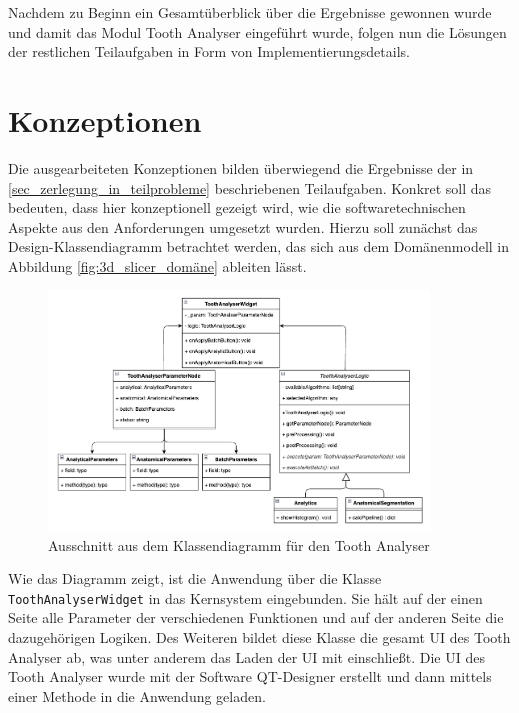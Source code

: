 Nachdem zu Beginn ein Gesamtüberblick über die Ergebnisse gewonnen wurde und damit
das Modul Tooth Analyser eingeführt wurde, folgen nun die Lösungen der
restlichen Teilaufgaben in Form von Implementierungsdetails.

\pagebreak

\section{Konzeptionen}
\label{sec:konzeptionen} Die ausgearbeiteten Konzeptionen bilden überwiegend die
Ergebnisse der in \ref{sec_zerlegung_in_teilprobleme} beschriebenen Teilaufgaben.
Konkret soll das bedeuten, dass hier konzeptionell gezeigt wird, wie die
softwaretechnischen Aspekte aus den Anforderungen umgesetzt wurden. Hierzu soll zunächst
das Design-Klassendiagramm betrachtet werden, das sich aus dem Domänenmodell in
Abbildung \ref{fig:3d_slicer_domäne} ableiten lässt.

\begin{figure}[h]
	\centering
	\includegraphics[width=0.9\textwidth]{
		img/tooth_analyser_class_diagram_light.png
	}
	\caption{Ausschnitt aus dem Klassendiagramm für den Tooth Analyser}
	\label{fig:klassendiagramm}
\end{figure}

Wie das Diagramm zeigt, ist die Anwendung über die Klasse \texttt{ToothAnalyserWidget}
in das Kernsystem eingebunden. Sie hält auf der einen Seite alle Parameter der
verschiedenen Funktionen und auf der anderen Seite die dazugehörigen Logiken. Des
Weiteren bildet diese Klasse die gesamt UI des Tooth Analyser ab, was unter
anderem das Laden der \ac{UI} mit einschließt. Die UI des Tooth Analyser wurde
mit der Software QT-Designer erstellt und dann mittels einer Methode in die
Anwendung geladen.

